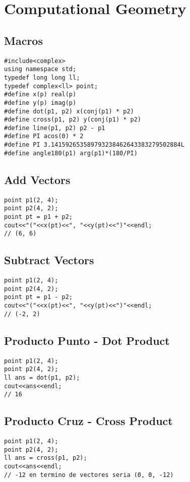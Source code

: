 \documentclass[10pt,letterpaper,twocolumn,twosided]{article}
\begin{document}
\section{Computational Geometry}

\subsection{Macros}
\begin{lstlisting}
#include<complex>
using namespace std;
typedef long long ll;
typedef complex<ll> point;
#define x(p) real(p)
#define y(p) imag(p)
#define dot(p1, p2) x(conj(p1) * p2)
#define cross(p1, p2) y(conj(p1) * p2)
#define line(p1, p2) p2 - p1
#define PI acos(0) * 2
#define PI 3.141592653589793238462643383279502884L
#define angle180(p1) arg(p1)*(180/PI)
\end{lstlisting}

\subsection{Add Vectors}
\begin{lstlisting}
point p1(2, 4);
point p2(4, 2);
point pt = p1 + p2;
cout<<"("<<x(pt)<<", "<<y(pt)<<")"<<endl;
// (6, 6)
\end{lstlisting}

\subsection{Subtract Vectors}
\begin{lstlisting}
point p1(2, 4);
point p2(4, 2);
point pt = p1 - p2;
cout<<"("<<x(pt)<<", "<<y(pt)<<")"<<endl;
// (-2, 2)
\end{lstlisting}

\subsection{Producto Punto - Dot Product}
\begin{lstlisting}
point p1(2, 4);
point p2(4, 2);
ll ans = dot(p1, p2);
cout<<ans<<endl;
// 16
\end{lstlisting}

\subsection{Producto Cruz - Cross Product}
\begin{lstlisting}
point p1(2, 4);
point p2(4, 2);
ll ans = cross(p1, p2);
cout<<ans<<endl;
// -12 en termino de vectores seria (0, 0, -12)
\end{lstlisting}
\end{document}
